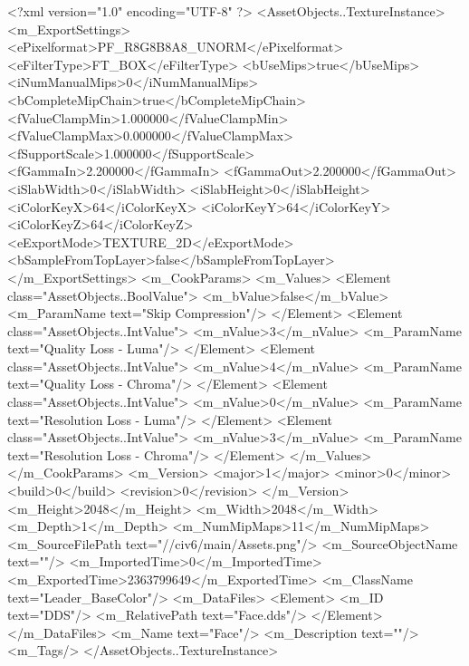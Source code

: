 <?xml version="1.0" encoding="UTF-8" ?>
<AssetObjects..TextureInstance>
	<m_ExportSettings>
		<ePixelformat>PF_R8G8B8A8_UNORM</ePixelformat>
		<eFilterType>FT_BOX</eFilterType>
		<bUseMips>true</bUseMips>
		<iNumManualMips>0</iNumManualMips>
		<bCompleteMipChain>true</bCompleteMipChain>
		<fValueClampMin>1.000000</fValueClampMin>
		<fValueClampMax>0.000000</fValueClampMax>
		<fSupportScale>1.000000</fSupportScale>
		<fGammaIn>2.200000</fGammaIn>
		<fGammaOut>2.200000</fGammaOut>
		<iSlabWidth>0</iSlabWidth>
		<iSlabHeight>0</iSlabHeight>
		<iColorKeyX>64</iColorKeyX>
		<iColorKeyY>64</iColorKeyY>
		<iColorKeyZ>64</iColorKeyZ>
		<eExportMode>TEXTURE_2D</eExportMode>
		<bSampleFromTopLayer>false</bSampleFromTopLayer>
	</m_ExportSettings>
	<m_CookParams>
		<m_Values>
			<Element class="AssetObjects..BoolValue">
				<m_bValue>false</m_bValue>
				<m_ParamName text="Skip Compression"/>
			</Element>
			<Element class="AssetObjects..IntValue">
				<m_nValue>3</m_nValue>
				<m_ParamName text="Quality Loss - Luma"/>
			</Element>
			<Element class="AssetObjects..IntValue">
				<m_nValue>4</m_nValue>
				<m_ParamName text="Quality Loss - Chroma"/>
			</Element>
			<Element class="AssetObjects..IntValue">
				<m_nValue>0</m_nValue>
				<m_ParamName text="Resolution Loss - Luma"/>
			</Element>
			<Element class="AssetObjects..IntValue">
				<m_nValue>3</m_nValue>
				<m_ParamName text="Resolution Loss - Chroma"/>
			</Element>
		</m_Values>
	</m_CookParams>
	<m_Version>
		<major>1</major>
		<minor>0</minor>
		<build>0</build>
		<revision>0</revision>
	</m_Version>
	<m_Height>2048</m_Height>
	<m_Width>2048</m_Width>
	<m_Depth>1</m_Depth>
	<m_NumMipMaps>11</m_NumMipMaps>
	<m_SourceFilePath text="//civ6/main/Assets\tex\Face.png"/>
	<m_SourceObjectName text=""/>
	<m_ImportedTime>0</m_ImportedTime>
	<m_ExportedTime>2363799649</m_ExportedTime>
	<m_ClassName text="Leader_BaseColor"/>
	<m_DataFiles>
		<Element>
			<m_ID text="DDS"/>
			<m_RelativePath text="Face.dds"/>
		</Element>
	</m_DataFiles>
	<m_Name text="Face"/>
	<m_Description text=""/>
	<m_Tags/>
</AssetObjects..TextureInstance>

